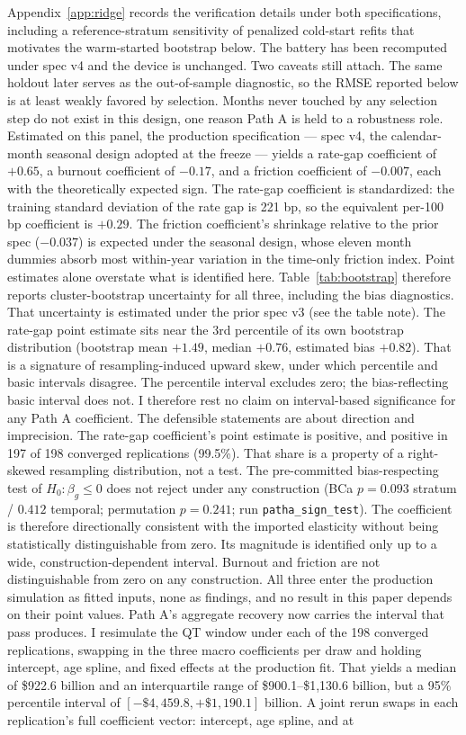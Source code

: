 \documentclass[12pt]{article}
\begin{document}
Appendix~\ref{app:ridge} records the verification details under both specifications, including a reference-stratum sensitivity of penalized cold-start refits that motivates the warm-started bootstrap below. The battery has been recomputed under spec v4 and the device is unchanged. Two caveats still attach. The same holdout later serves as the out-of-sample diagnostic, so the RMSE reported below is at least weakly favored by selection. Months never touched by any selection step do not exist in this design, one reason Path A is held to a robustness role.
Estimated on this panel, the production specification --- spec v4, the calendar-month seasonal design adopted at the freeze --- yields a rate-gap coefficient of $+0.65$, a burnout coefficient of $-0.17$, and a friction coefficient of $-0.007$, each with the theoretically expected sign. The rate-gap coefficient is standardized: the training standard deviation of the rate gap is 221 bp, so the equivalent per-100 bp coefficient is $+0.29$. The friction coefficient's shrinkage relative to the prior spec ($-0.037$) is expected under the seasonal design, whose eleven month dummies absorb most within-year variation in the time-only friction index. Point estimates alone overstate what is identified here. Table~\ref{tab:bootstrap} therefore reports cluster-bootstrap uncertainty for all three, including the bias diagnostics. That uncertainty is estimated under the prior spec v3 (see the table note). The rate-gap point estimate sits near the 3rd percentile of its own bootstrap distribution (bootstrap mean $+1.49$, median $+0.76$, estimated bias $+0.82$). That is a signature of resampling-induced upward skew, under which percentile and basic intervals disagree. The percentile interval excludes zero; the bias-reflecting basic interval does not. I therefore rest no claim on interval-based significance for any Path A coefficient. The defensible statements are about direction and imprecision. The rate-gap coefficient's point estimate is positive, and positive in 197 of 198 converged replications (99.5\%). That share is a property of a right-skewed resampling distribution, not a test. The pre-committed bias-respecting test of $H_0\!: \beta_g \le 0$ does not reject under any construction (BCa $p = 0.093$ stratum / $0.412$ temporal; permutation $p = 0.241$; run \texttt{patha\_sign\_test}). The coefficient is therefore directionally consistent with the imported elasticity without being statistically distinguishable from zero. Its magnitude is identified only up to a wide, construction-dependent interval. Burnout and friction are not distinguishable from zero on any construction. All three enter the production simulation as fitted inputs, none as findings, and no result in this paper depends on their point values. Path A's aggregate recovery now carries the interval that pass produces. I resimulate the QT window under each of the 198 converged replications, swapping in the three macro coefficients per draw and holding intercept, age spline, and fixed effects at the production fit. That yields a median of \$922.6 billion and an interquartile range of \$900.1--\$1{,}130.6 billion, but a 95\% percentile interval of $[-\$4{,}459.8, +\$1{,}190.1]$ billion. A joint rerun swaps in each replication's full coefficient vector: intercept, age spline, and at 
\end{document}
